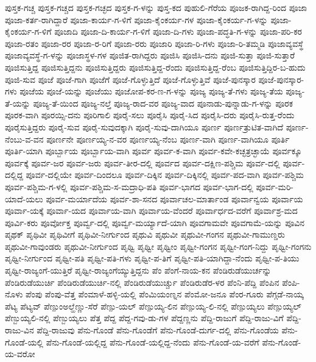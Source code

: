 ಪುಸ್ತಕ-ಗಚ್ಚ
ಪುಸ್ತಕ-ಗಚ್ಚದ
ಪುಸ್ತಕ-ಗಚ್ಛದ
ಪುಸ್ತಕ-ಗ-ಳನ್ನು
ಪುಸ್ತ-ಕದ
ಪುಹುಲಿ-ಗೆರೆಯ
ಪೂಜಕ-ರಾಗಿದ್ದ-ರಿಂದ
ಪೂಜಾ
ಪೂಜಾ-ಕರ್ತ-ರಾಗಿದ್ದಾರೆ
ಪೂಜಾ-ಕಾರ್ಯ-ಗ-ಳಿಗೆ
ಪೂಜಾ-ಕೈಂಕರ್ಯ-ಗಳ
ಪೂಜಾ-ಕೈಂಕರ್ಯ-ಗ-ಳನ್ನು
ಪೂಜಾ-ಕೈಂಕರ್ಯ-ಗ-ಳಿಗೆ
ಪೂಜಾದಿ
ಪೂಜಾ-ದಿ-ಕಾರ್ಯ-ಗ-ಳಿಗೆ
ಪೂಜಾ-ದಿ-ಗಳು
ಪೂಜಾ-ಪದ್ಧತಿ-ಗ-ಳನ್ನು
ಪೂಜಾ-ಪರಿ-ಕರ
ಪೂಜಾ-ರತಂ
ಪೂಜಾ-ರರ
ಪೂಜಾ-ರ-ರಿಗೆ
ಪೂಜಾ-ರರು
ಪೂಜಾರಿ
ಪೂಜಾ-ರಿ-ಗಳು
ಪೂಜಾ-ರಿ-ತಮ್ಮಡಿ
ಪೂಜಾವ್ಯವಸ್ಥೆ
ಪೂಜಾವ್ಯವಸ್ಥೆ-ಗ-ಳನ್ನು
ಪೂಜಾಸ್ಥಳ-ಗಳ
ಪೂಜಿತ-ರಾಗಿದ್ದರು
ಪೂಜಿಸಿ
ಪೂಜಿಸಿ-ದನು
ಪೂಜಿ-ಸುತ್ತಾ
ಪೂಜಿ-ಸುತ್ತಾರೆ
ಪೂಜಿಸುತ್ತಿದ್ದ
ಪೂಜಿಸುತ್ತಿದ್ದನು
ಪೂಜಿಸುತ್ತಿದ್ದರು
ಪೂಜಿಸುತ್ತಿದ್ದ-ರೆಂದು
ಪೂಜಿಸುತ್ತಿದ್ದ-ರೆಂಬ
ಪೂಜಿಸುತ್ತಿದ್ದಿರ-ಬ-ಹುದು
ಪೂಜಿ-ಸುವ
ಪೂಜೆ
ಪೂಜೆ-ಗಾಗಿ
ಪೂಜೆಗೆ
ಪೂಜೆ-ಗೊಳ್ಳುತ್ತಿದೆ
ಪೂಜೆ-ಗೊಳ್ಳುತ್ತಿವೆ
ಪೂಜೆ-ಪುನಸ್ಕಾರ
ಪೂಜೆ-ಪುನಸ್ಕಾರ-ಗಳು
ಪೂಜೆಯ
ಪೂಜೆ-ಯನ್ನು
ಪೂಜೆಯು
ಪೂಜೋಪ-ಕರ-ಣ-ಗ-ಳನ್ನು
ಪೂಜ್ಯ
ಪೂಜ್ಯ-ತೆ-ಗಳು
ಪೂಜ್ಯ-ತೆಯ
ಪೂಜ್ಯ-ತೆ-ಯನ್ನು
ಪೂಜ್ಯ-ತೆ-ಯಿಂದ
ಪೂಜ್ಯ-ನಲ್ತೆ
ಪೂಜ್ಯ-ರಾದ-ವರ
ಪೂಜ್ಯ-ವಾದ
ಪೂನಾಡು-ಪುನ್ನಾಡು-ಗ-ಳನ್ನು
ಪೂರಕ
ಪೂರಕ-ವಾಗಿ
ಪೂರಯ್ಸಿ-ದನು
ಪೂರಿಗಾಲಿ
ಪೂರೈ-ಸಲು
ಪೂರೈಸಿ
ಪೂರೈ-ಸಿದ
ಪೂರೈಸಿ-ದರು
ಪೂರೈಸಿ-ರುತ್ತ-ರೆಂದು
ಪೂರೈಸುತ್ತಿದ್ದರು
ಪೂರೈ-ಸುವ
ಪೂರೈ-ಸುವುದಕ್ಕಾಗಿ
ಪೂರೈ-ಸುವು-ದಾಗಿಯೂ
ಪೂರ್ಣ
ಪೂರ್ಣತ್ರುಟಿತ-ವಾಗಿದೆ
ಪೂರ್ಣ-ನೆಂಬು-ವ-ವನ
ಪೂರ್ಣನೇ
ಪೂರ್ಣಯ್ಯ-ನ-ವರ
ಪೂರ್ಣಯ್ಯ-ನೆಂಬ
ಪೂರ್ಣ-ವಾಗಿ
ಪೂರ್ಣ-ವಾಗಿಯೂ
ಪೂರ್ತಿ
ಪೂರ್ತಿ-ಯಾಗಿ
ಪೂರ್ಬ್ಬಾಯ
ಪೂರ್ಬ್ಬಾಯ-ವಾಗಿ
ಪೂರ್ವ
ಪೂರ್ವ-ಕ-ವಾಗಿ
ಪೂರ್ವ-ಕವೇ-ಕಚ್ಛತ್ರಚ್ಛಾಯೆ
ಪೂರ್ವಕ್ಕೂ
ಪೂರ್ವಕ್ಕೆ
ಪೂರ್ವ-ಜರ
ಪೂರ್ವ-ಜರು
ಪೂರ್ವ-ತೀರ-ದಲ್ಲಿ
ಪೂರ್ವದ
ಪೂರ್ವ-ದಕ್ಷಿಣ-ಪಶ್ಚಿಮ
ಪೂರ್ವ-ದಲ್ಲಿ
ಪೂರ್ವ-ದಲ್ಲಿದ್ದ
ಪೂರ್ವ-ದಲ್ಲಿಯೇ
ಪೂರ್ವ-ದಿಂದಲೂ
ಪೂರ್ವ-ದಿಕ್ಕಿನ
ಪೂರ್ವ-ದಿಕ್ಕಿನಲ್ಲಿ
ಪೂರ್ವ-ಪದ-ವಾಗಿ
ಪೂರ್ವ-ಪಶ್ಚಿಮ
ಪೂರ್ವ-ಪಶ್ಚಿಮ-ಗ-ಳಲ್ಲಿ
ಪೂರ್ವ-ಪಶ್ಚಿಮ-ಸ-ಮದ್ರಾಧಿ-ಪತಿ
ಪೂರ್ವ-ಭಾಗದ
ಪೂರ್ವ-ಭಾಗ-ದಲ್ಲಿ
ಪೂರ್ವ-ಮರಿ-ಯಾದೆ-ಯಲು
ಪೂರ್ವ-ಮರ್ಯಾದೆಯ
ಪೂರ್ವ-ಶಾ-ಸನದ
ಪೂರ್ವಾಚಲ-ಮಾರ್ತಾಂಡ
ಪೂರ್ವಾನ್ವಯ
ಪೂರ್ವಾಯ
ಪೂರ್ವಾ-ಯಕ್ಕೆ
ಪೂರ್ವಾ-ಯದ
ಪೂರ್ವಾಯ-ವಾಗಿ
ಪೂರ್ವಾಯ-ವೆಂದರೆ
ಪೂರ್ವಾರ್ಧದ-ವರೆಗೆ
ಪೂರ್ವಾಶ್ರ-ಮದ
ಪೂರ್ವಿ-ಕರು
ಪೂರ್ವೋಕ್ತ
ಪೂರ್ವ್ವ-ದಲ್ಲಿ
ಪೂರ್ವ್ವ-ಮರ್ಯ್ಯಾದೆ-ಯಾಗಿ
ಪೂವಗಾಮವೇ
ಪೂವಗಾಮೆ-ಯನ್ನು
ಪೂವಿನ
ಪೃಥಕ್
ಪೃಥಿವೀ
ಪೃಥಿವೀಗೆ
ಪೃಥಿವೀ-ನೀರ್ಗುಂದ
ಪೃಥುವಿ
ಪೃಥುವೀ
ಪೃಥುವೀ-ಗಂಗನ
ಪೃಥುವೀ-ಗಾಮುಣ್ಡರು
ಪೃಥುವೀ-ಗಾವುಂಡರು
ಪೃಥುವೀ-ನೀರ್ಗುಂದ
ಪೃಥ್ವಿ
ಪೃಥ್ವೀ
ಪೃಥ್ವೀಂ
ಪೃಥ್ವೀ-ಗಂಗನ
ಪೃಥ್ವೀ-ಗಂಗ-ನಿದ್ದು
ಪೃಥ್ವೀ-ಗಂಗನು
ಪೃಥ್ವೀ-ನೀರ್ಗುಂದ
ಪೃಥ್ವೀ-ಪತಿ
ಪೃಥ್ವೀ-ಪತಿ-ಗಳು
ಪೃಥ್ವೀ-ಪ-ತಿಗೆ
ಪೃಥ್ವೀ-ಪತಿ-ಯಾಗಿದ್ದಾ-ನೆಂದು
ಪೃಥ್ವೀ-ಪ-ತಿಯು
ಪೃಥ್ವೀ-ರಾಜ್ಯಂಗೆ-ಯುತ್ತಿರೆ
ಪೃಥ್ವೀ-ರಾಜ್ಯಂಗೆಯ್ಯುತ್ತಿದ್ದನು
ಪೆಂ
ಪೆಂಗೆ-ನಾಯ-ಕನ
ಪೆಂಡಿರುಡೆಯುರ್ಚನ್ನು
ಪೆಂಡಿರುಡೆಯುರ್ಚಿ
ಪೆಂಡಿರುಡೆಯುರ್ಚಿ-ನಲ್ಲಿ
ಪೆಂಡಿರುಡೆಯುರ್ಚ್ಚು
ಪೆಂಡಿರುಡೆರ-ಳರ
ಪೆಂನಿ-ಪೆದ್ದಿ
ಪೆಂಪಿನ
ಪೆಂಪಿ-ನೊಳು
ಪೆಂಪು
ಪೆಂಪು-ವೆತ್ತ
ಪೆಂಮಾಳೆ-ಹಳ್ಳಿ-ಯಲ್ಲಿ
ಪೆಂಮಿಯಂಣ್ನನ
ಪೆಂಮೋ-ಜನೂ
ಪೆಂರ-ಗೂರು
ಪೆಗ್ಗಡೆ-ನಾಯ್ಕ
ಪೆಟ್ಯ
ಪೆಟ್ಯವ್
ಪೆಣ್ಪುಂಅಲ್ಹೆಣ್ಣು-ಸೆರೆ
ಪೆಣ್ಪು-ಯಲ್
ಪೆಣ್ಪುಯ್ಯ-ಲಿನ
ಪೆಣ್ಪುಯ್ಯ-ಲಿ-ನಲ್ಲಿ
ಪೆಣ್ಪುಯ್ಯಲು
ಪೆಣ್ಪುಯ್ಯಲ್
ಪೆಣ್ಬುಯ್ಯಲಿ-ನಲ್ಲಿ
ಪೆಣ್ಬುಯ್ಯಲು
ಪೆತ್ತ
ಪೆದ್ದ
ಪೆದ್ದ-ಗವು-ಡು-ಗಳ
ಪೆದ್ದಣ್ಣನು
ಪೆದ್ದಿ-ರಾಜುಗೆ
ಪೆದ್ದಿ-ರಾಜು-ವಿಗೆ
ಪೆದ್ದಿ-ರಾಜು-ವಿನ
ಪೆದ್ದಿ-ರಾಜುವು
ಪೆನು-ಗೊಂಡೆ
ಪೆನು-ಗೊಂಡೆಗೆ
ಪೆನು-ಗೊಂಡೆ-ದುರ್ಗ-ದಲ್ಲಿ
ಪೆನು-ಗೊಂಡೆಯ
ಪೆನು-ಗೊಂಡೆ-ಯಲ್ಲಿ
ಪೆನು-ಗೊಂಡೆ-ಯಲ್ಲಿದ್ದ
ಪೆನು-ಗೊಂಡೆ-ಯಲ್ಲಿದ್ದ-ನೆಂದು
ಪೆನು-ಗೊಂಡೆ-ಯ-ವರೆಗೆ
ಪೆನು-ಗೊಂಡೆ-ಯ-ವರೋ
